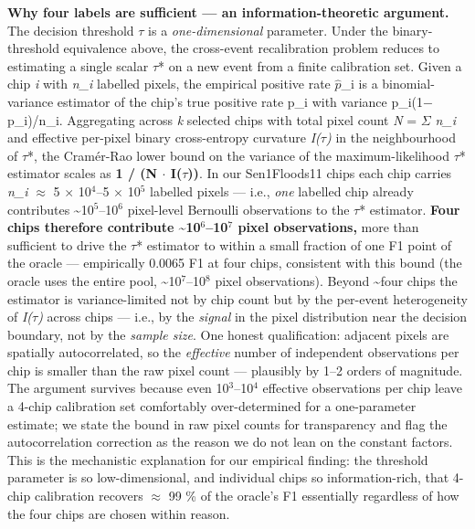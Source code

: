 \textbf{Why four labels are sufficient --- an information-theoretic argument.}
The decision threshold $\tau$ is a \emph{one-dimensional} parameter. Under the
binary-threshold equivalence above, the cross-event recalibration
problem reduces to estimating a single scalar $\tau$* on a new event from a
finite calibration set. Given a chip \emph{i} with \emph{n\_i} labelled pixels,
the empirical positive rate \(\hat{p}\)\_i is a binomial-variance estimator of
the chip's true positive rate p\_i with variance p\_i(1$-$p\_i)/n\_i.
Aggregating across \emph{k} selected chips with total pixel count \emph{N} = $\Sigma$
\emph{n\_i} and effective per-pixel binary cross-entropy curvature \emph{I($\tau$)} in
the neighbourhood of $\tau$*, the Cram\'er-Rao lower bound on the variance of
the maximum-likelihood $\tau$* estimator scales as \textbf{1 / (N $\cdot$ I($\tau$))}. In
our Sen1Floods11 chips each chip carries \emph{n\_i} $\approx$ 5 $\times$ 10$^{4}$--5 $\times$ 10$^{5}$
labelled pixels --- i.e., \emph{one} labelled chip already contributes
\textasciitilde10$^{5}$--10$^{6}$ pixel-level Bernoulli observations to the $\tau$* estimator.
\textbf{Four chips therefore contribute \textasciitilde10$^{6}$--10$^{7}$ pixel observations,} more
than sufficient to drive the $\tau$* estimator to within a small fraction
of one F1 point of the oracle --- empirically 0.0065 F1 at four chips,
consistent with this bound (the oracle uses the
entire pool, \textasciitilde10$^{7}$--10$^{8}$ pixel observations). Beyond \textasciitilde four chips the
estimator is variance-limited not by chip count but by the per-event
heterogeneity of \emph{I($\tau$)} across chips --- i.e., by the \emph{signal} in the
pixel distribution near the decision boundary, not by the \emph{sample
size}. One honest qualification: adjacent pixels are spatially
autocorrelated, so the \emph{effective} number of independent observations
per chip is smaller than the raw pixel count --- plausibly by 1--2 orders
of magnitude. The argument survives because even 10$^{3}$--10$^{4}$ effective
observations per chip leave a 4-chip calibration set comfortably
over-determined for a one-parameter estimate; we state the bound in
raw pixel counts for transparency and flag the autocorrelation
correction as the reason we do not lean on the constant factors.
This is the mechanistic explanation for our empirical finding:
the threshold parameter is so low-dimensional, and individual chips so
information-rich, that 4-chip calibration recovers $\approx$ 99 \% of the
oracle's F1 essentially regardless of how the four chips are chosen
within reason.

